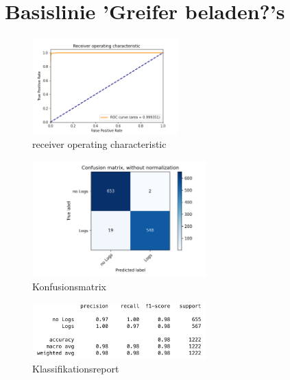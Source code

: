 \chapter{Basislinie 'Greifer beladen?'s}
\label{appendix:BasislinieBaumstämme}

\begin{figure}[h]
	\centering
	\includegraphics[width=0.5\textwidth, center]{bilder/Anhang/Baseline/Logs/Logs_validation/Logs_Baseline_ROC.png}
	\caption[Baumstammklassifikation Basislinie ROC]{receiver operating characteristic}
	\label{img:BaselineLogsROC}
\end{figure}	

\begin{figure}[h]
	\centering
	\includegraphics[width=0.6\textwidth, center]{bilder/Anhang/Baseline/Logs/Logs_validation/Logs_Baseline_Confusion_Matrix.png}
	\caption[Konfusionsmatrix Baumstammklassifikation Basislinie]{Konfusionsmatrix}
	\label{img:BaselineLogsConfusionMatrix}
\end{figure}	

\begin{figure}[h]
	\centering
	\includegraphics[width=0.6\textwidth, center]{bilder/Anhang/Baseline/Logs/Logs_validation/classification_report.png}
	\caption[Klassifikationsreport Baumstammklassifikation Basislinie]{Klassifikationsreport}
	\label{img:BaselineLogsKlassifikationsreport}
\end{figure}	
